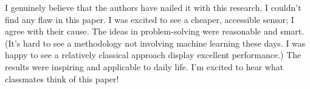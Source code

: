 \documentclass[10pt,a4paper]{article}
\begin{document}
	I genuinely believe that the authors have nailed it with this research. I couldn't find any flaw in this paper. I was excited to see a cheaper, accessible sensor; I agree with their cause. The ideas in problem-solving were reasonable and smart. (It's hard to see a methodology not involving machine learning these days. I was happy to see a relatively classical approach display excellent performance.) The results were inspiring and applicable to daily life. I'm excited to hear what classmates think of this paper! 
	
\end{document}
